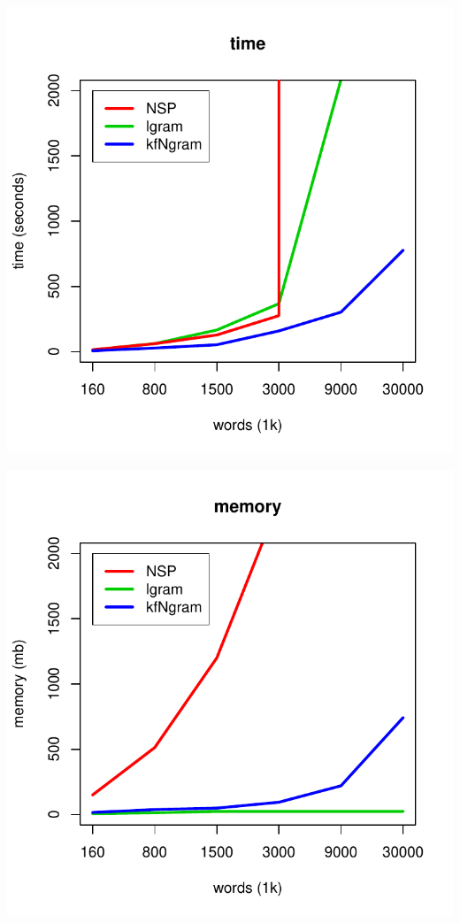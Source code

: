 \documentclass[12pt,a4paper]{report}
\begin{document}
\begin{center}
\begin{minipage}[h]{0.4\textwidth}
\centering
\includegraphics[scale=0.55]{time.pdf}
\end{minipage}
\hspace{3em}
\begin{minipage}[h]{0.4\textwidth}
\centering
\includegraphics[scale=0.55]{memory.pdf}
\end{minipage}
\end{center}
\end{document}
